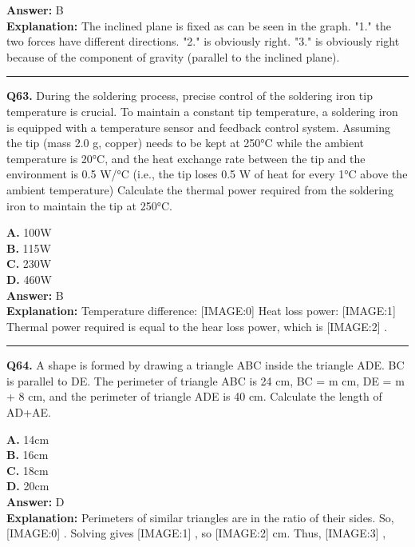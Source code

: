 \documentclass[12pt]{article}
\begin{document}
\textbf{Answer:} B \\
\textbf{Explanation:} The inclined plane is fixed as can be seen in the graph. "1." the two forces have different directions. "2." is obviously right. "3." is obviously right because of the component of gravity (parallel to the inclined plane).

\hrule
\vspace{1em}


\noindent
\textbf{Q63.} During the soldering process, precise control of the soldering iron tip temperature is crucial. To maintain a constant tip temperature, a soldering iron is equipped with a temperature sensor and feedback control system. Assuming the tip (mass 2.0 g, copper) needs to be kept at 250°C while the ambient temperature is 20°C, and the heat exchange rate between the tip and the environment is 0.5 W/°C (i.e., the tip loses 0.5 W of heat for every 1°C above the ambient temperature)
Calculate the thermal power required from the soldering iron to maintain the tip at 250°C.



\textbf{A.} 100W \\
\textbf{B.} 115W \\
\textbf{C.} 230W \\
\textbf{D.} 460W \\

\textbf{Answer:} B \\
\textbf{Explanation:} Temperature difference:
[IMAGE:0]
Heat loss power:
[IMAGE:1]
Thermal power required is equal to the hear loss power, which is
[IMAGE:2]
.

\hrule
\vspace{1em}


\noindent
\textbf{Q64.} A shape is formed by drawing a triangle ABC inside the triangle ADE. BC is parallel to DE. The perimeter of triangle ABC is 24 cm, BC = m cm, DE = m + 8 cm, and the perimeter of triangle ADE is 40 cm.
Calculate the length of AD+AE.



\textbf{A.} 14cm \\
\textbf{B.} 16cm \\
\textbf{C.} 18cm \\
\textbf{D.} 20cm \\

\textbf{Answer:} D \\
\textbf{Explanation:} Perimeters of similar triangles are in the ratio of their sides. So,
[IMAGE:0]
. Solving gives
[IMAGE:1]
, so
[IMAGE:2]
cm.
Thus,
[IMAGE:3]
,
\end{document}
